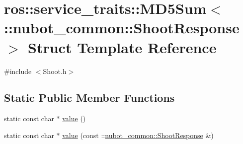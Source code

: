 \hypertarget{structros_1_1service__traits_1_1MD5Sum_3_01_1_1nubot__common_1_1ShootResponse_01_4}{\section{ros\-:\-:service\-\_\-traits\-:\-:M\-D5\-Sum$<$ \-:\-:nubot\-\_\-common\-:\-:Shoot\-Response $>$ Struct Template Reference}
\label{structros_1_1service__traits_1_1MD5Sum_3_01_1_1nubot__common_1_1ShootResponse_01_4}
}


{\ttfamily \#include $<$Shoot.\-h$>$}

\subsection*{Static Public Member Functions}
\begin{DoxyCompactItemize}
\item 
static const char $\ast$ \hyperlink{structros_1_1service__traits_1_1MD5Sum_3_01_1_1nubot__common_1_1ShootResponse_01_4_a39b1bfec7eb80f3db2843fcbab713f73}{value} ()
\item 
static const char $\ast$ \hyperlink{structros_1_1service__traits_1_1MD5Sum_3_01_1_1nubot__common_1_1ShootResponse_01_4_a08d8cc264b99166140ff32a1e8aba252}{value} (const \-::\hyperlink{namespacenubot__common_a7fc7346cebf4ea3bdbc7c25438d3959e}{nubot\-\_\-common\-::\-Shoot\-Response} \&)
\end{DoxyCompactItemize}


